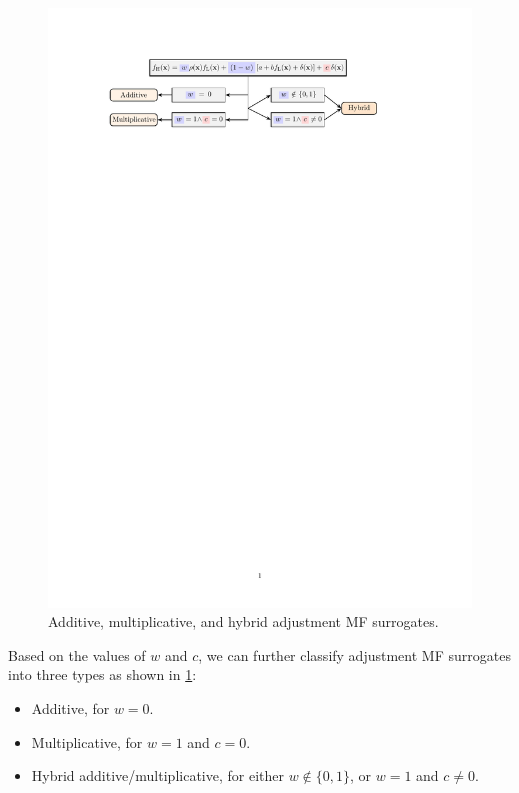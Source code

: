 \documentclass[journal ]{new-aiaa}
\begin{document}
\begin{figure}
	\centering
	\includegraphics[scale=0.9]{Fig3.pdf}
	\caption{Additive, multiplicative, and hybrid adjustment MF surrogates.}
	\label{Fig-3}
\end{figure}

Based on the values of $w$ and $c$, we can further classify adjustment MF surrogates into three types as shown in \cref{Fig-3}:
\begin{itemize}
	\item Additive, for $w=0$.
	
	\item Multiplicative, for $w=1$ and $c=0$.
	
	\item Hybrid additive/multiplicative, for either $w \notin \{0,1\}$, or $w=1$ and $c \neq 0$.
\end{itemize}
\end{document}
